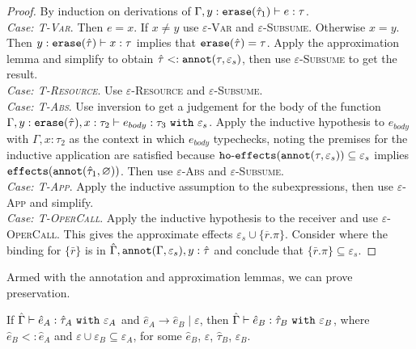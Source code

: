 \begin{proof}
By induction on derivations of $\Gamma, y: \mathtt{erase}(\hat \tau_1) \vdash e: \tau$. \\

\textit{Case: \textsc{T-Var}}. Then $e = x$. If $x \neq y$ use
\textsc{$\varepsilon$-Var} and \textsc{$\varepsilon$-Subsume}. Otherwise $x = y$.
Then $y: \mathtt{erase}(\hat \tau) \vdash x: \tau$ implies that $\mathtt{erase}(\hat \tau) = \tau$.
Apply the approximation lemma and simplify to obtain $\hat \tau <:
\mathtt{annot}(\tau, \varepsilon_s)$, then use \textsc{$\varepsilon$-Subsume} to get the
result.\\

\textit{Case: \textsc{T-Resource}}. Use \textsc{$\varepsilon$-Resource} and
\textsc{$\varepsilon$-Subsume}.\\

\textit{Case: \textsc{T-Abs}}. Use inversion to get a judgement for the body of the
function $\Gamma, y: \mathtt{erase}(\hat \tau), x: \tau_2 \vdash e_{body}: \tau_3
~\mathtt{with}~ \varepsilon_s$. Apply the inductive hypothesis to $e_{body}$ with
$\Gamma, x: \tau_2$ as the context in which $e_{body}$ typechecks, noting the
premises for the inductive application are satisfied because
$\mathtt{ho \hbox{-} effects}(\mathtt{annot}(\tau, \varepsilon_s)) \subseteq \varepsilon_s$ implies
$\mathtt{effects}(\mathtt{annot}(\hat \tau_1, \varnothing))$. Then use \textsc{$\varepsilon$-Abs} and
\textsc{$\varepsilon$-Subsume}. \\

\textit{Case: \textsc{T-App}}. Apply the inductive assumption to the subexpressions,
then use \textsc{$\varepsilon$-App} and simplify. \\

\textit{Case: \textsc{T-OperCall}}. Apply the inductive hypothesis to the receiver and
use \textsc{$\varepsilon$-OperCall}. This gives the approximate effects $\varepsilon_s
\cup \{ \overline{r}.\pi \}$. Consider where the binding for $\{ \bar r \}$ is in
$\hat \Gamma, \mathtt{annot}(\Gamma, \varepsilon_s), y: \hat \tau$ and conclude that
$\{ \bar r.\pi \} \subseteq \varepsilon_s$.
\end{proof}

Armed with the annotation and approximation lemmas, we can prove preservation.

\begin{theorem}
If $\hat \Gamma \vdash \hat e_A: \hat \tau_A~\mathtt{with}~ \varepsilon_A$ and
$\hat e_A \longrightarrow \hat e_B \mid \varepsilon$, then $\hat \Gamma \vdash
\hat e_B: \hat \tau_B~\mathtt{with}~ \varepsilon_B$, where $\hat e_B <: \hat e_A$
and $\varepsilon \cup \varepsilon_B \subseteq \varepsilon_A$, for some $\hat e_B$,
$\varepsilon$, $\hat \tau_B$, $\varepsilon_B$.
\end{theorem}

